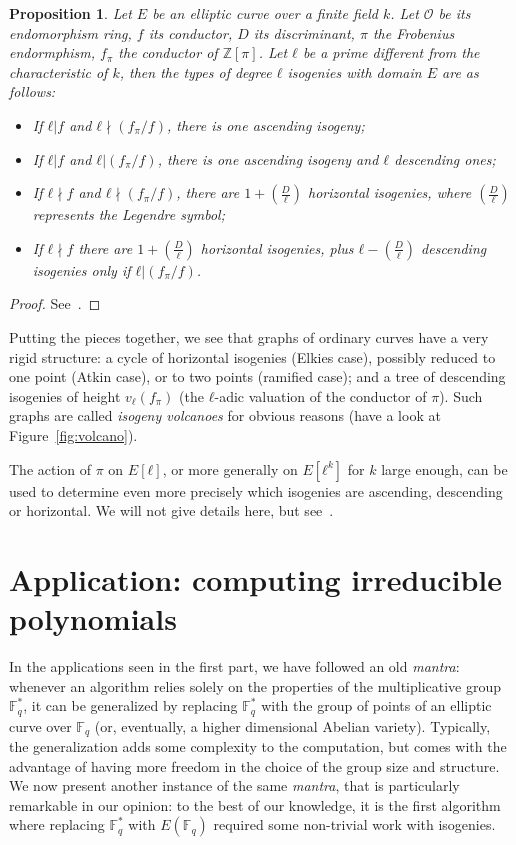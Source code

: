 \documentclass[10pt]{article}
\theoremstyle{plain}
\newtheorem{proposition}[theorem]{Proposition}
\theoremstyle{definition}
\def\F{\ensuremath{\mathbb{F}}}
\def\O{\ensuremath{\mathcal{O}}}
\begin{document}
\begin{proposition}
  Let $E$ be an elliptic curve over a finite field $k$. %
  Let $\O$ be its endomorphism ring, $f$ its conductor, $D$ its
  discriminant, $π$ the Frobenius endormphism, $f_π$ the conductor of
  $ℤ[π]$. %
  Let $ℓ$ be a prime different from the characteristic of $k$, then
  the types of degree $ℓ$ isogenies with domain $E$ are as follows:
  \begin{itemize}
  \item If $ℓ|f$ and $ℓ\nmid(f_π/f)$, there is one ascending isogeny;
  \item If $ℓ|f$ and $ℓ|(f_π/f)$, there is one ascending isogeny and
    $ℓ$ descending ones;
  \item If $ℓ\nmid f$ and $ℓ\nmid(f_π/f)$, there are
    $1+\left(\frac{D}{ℓ}\right)$ horizontal isogenies, where
    $\left(\frac{D}{ℓ}\right)$ represents the Legendre symbol;
    \item If $ℓ\nmid f$ there are $1+\left(\frac{D}{ℓ}\right)$
      horizontal isogenies, plus $ℓ-\left(\frac{D}{ℓ}\right)$
      descending isogenies only if $ℓ|(f_π/f)$.
  \end{itemize}
\end{proposition}
\begin{proof}
  See~\cite[Prop.~21]{kohel}.
\end{proof}

Putting the pieces together, we see that graphs of ordinary curves
have a very rigid structure: a cycle of horizontal isogenies (Elkies
case), possibly reduced to one point (Atkin case), or to two points
(ramified case); and a tree of descending isogenies of height
$v_ℓ(f_π)$ (the $ℓ$-adic valuation of the conductor of $π$). %
Such graphs are called \emph{isogeny volcanoes} for obvious reasons
(have a look at Figure~\ref{fig:volcano}).

The action of $π$ on $E[ℓ]$, or more generally on $E[ℓ^k]$ for $k$
large enough, can be used to determine even more precisely which
isogenies are ascending, descending or horizontal. %
We will not give details here, but
see~\cite{MiretMRV05,MiretMSTV06,ionica+joux13,defeo2016explicit}.


\section{Application: computing irreducible polynomials }

In the applications seen in the first part, we have followed an old
\emph{mantra}: whenever an algorithm relies solely on the properties
of the multiplicative group $\F_q^*$, it can be generalized by
replacing $\F_q^*$ with the group of points of an elliptic curve over
$\F_q$ (or, eventually, a higher dimensional Abelian variety). %
Typically, the generalization adds some complexity to the computation,
but comes with the advantage of having more freedom in the choice of
the group size and structure. %
We now present another instance of the same \emph{mantra}, that is
particularly remarkable in our opinion: to the best of our knowledge,
it is the first algorithm where replacing $\F_q^*$ with $E(\F_q)$
required some non-trivial work with isogenies.
\end{document}
